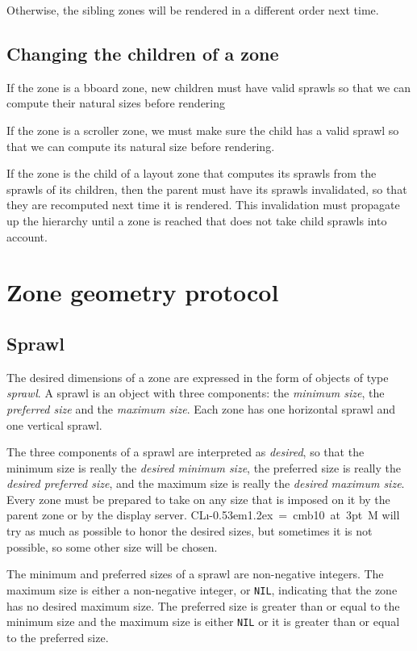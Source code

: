 \documentclass{report}
\def\Tiny{ \font\Tinyfont = cmb10 at 3pt \relax  \Tinyfont}
\def\clim{\textsf{CL{\i}\kern-0.53em\raise1.2ex\hbox{\Tiny 3}M}}
\begin{document}
Otherwise, the sibling zones will be rendered in a different order
next time.

\subsection{Changing the children of a zone}

If the zone is a bboard zone, new children must have valid sprawls so
that we can compute their natural sizes before rendering

If the zone is a scroller zone, we must make sure the child has a
valid sprawl so that we can compute its natural size before rendering.

If the zone is the child of a layout zone that computes its sprawls from
the sprawls of its children, then the parent must have its sprawls
invalidated, so that they are recomputed next time it is rendered.
This invalidation must propagate up the hierarchy until a zone is
reached that does not take child sprawls into account. 

\section{Zone geometry protocol}

\subsection{Sprawl}
\label{sec-zone-protocols-geometry-sprawl}

The desired dimensions of a zone are expressed in the form of objects
of type \emph{sprawl}.  A sprawl is an object with three components:
the \emph{minimum size}, the \emph{preferred size} and the \emph{maximum
  size}.  Each zone has one horizontal sprawl and one vertical sprawl.

The three components of a sprawl are interpreted as \emph{desired}, so
that the minimum size is really the \emph{desired minimum size}, the
preferred size is really the \emph{desired preferred size}, and the
maximum size is really the \emph{desired maximum size}.  Every zone
must be prepared to take on any size that is imposed on it by the
parent zone or by the display server.  \clim{} will try as much as
possible to honor the desired sizes, but sometimes it is not possible,
so some other size will be chosen.

The minimum and preferred sizes of a sprawl are non-negative
integers.  The maximum size is either a non-negative integer, or
\texttt{NIL}, indicating that the zone has no desired maximum size. 
The preferred size is greater than or equal to the minimum size and
the maximum size is either \texttt{NIL} or it is greater than or equal
to the preferred size. 
\end{document}
